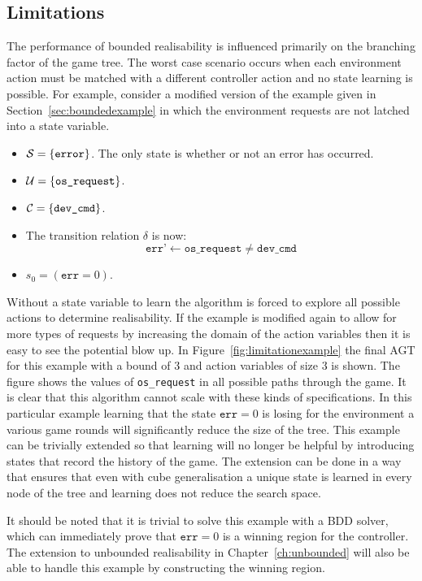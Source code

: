 \subsection{Limitations}

The performance of bounded realisability is influenced primarily on the branching factor of the game tree. The worst case scenario occurs when each environment action must be matched with a different controller action and no state learning is possible. For example, consider a modified version of the example given in Section~\ref{sec:boundedexample} in which the environment requests are not latched into a state variable.

\begin{itemize}
    \item $\mathcal{S} = \{ \texttt{error} \} $. The only state is whether or not an error has occurred. 
    \item $\mathcal{U} = \{ \texttt{os\_request} \} $. 
    \item $\mathcal{C} = \{ \texttt{dev\_cmd} \}$.
    \item The transition relation $\delta$ is now: $$ \texttt{err'} \gets \texttt{os\_request} \neq \texttt{dev\_cmd} $$
    \item $s_0 = (\texttt{err} = 0)$. 
\end{itemize}

Without a state variable to learn the algorithm is forced to explore all possible actions to determine realisability. If the example is modified again to allow for more types of requests by increasing the domain of the action variables then it is easy to see the potential blow up. In Figure~\ref{fig:limitationexample} the final AGT for this example with a bound of $3$ and action variables of size $3$ is shown. The figure shows the values of \texttt{os\_request} in all possible paths through the game. It is clear that this algorithm cannot scale with these kinds of specifications. In this particular example learning that the state $\texttt{err} = 0$ is losing for the environment a various game rounds will significantly reduce the size of the tree. This example can be trivially extended so that learning will no longer be helpful by introducing states that record the history of the game. The extension can be done in a way that ensures that even with cube generalisation a unique state is learned in every node of the tree and learning does not reduce the search space.

It should be noted that it is trivial to solve this example with a BDD solver, which can immediately prove that $\texttt{err} = 0$ is a winning region for the controller. The extension to unbounded realisability in Chapter~\ref{ch:unbounded} will also be able to handle this example by constructing the winning region.

